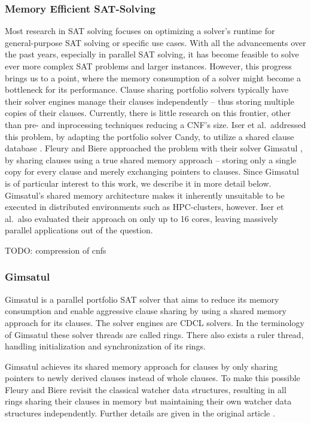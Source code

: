 \documentclass[12pt,a4paper,twoside]{scrartcl}
\numberwithin{equation}{section}
\begin{document}
\subsubsection{Memory Efficient SAT-Solving}

Most research in SAT solving focuses on optimizing a solver's runtime for general-purpose SAT solving or specific use cases. With all the advancements over the past years, especially in parallel SAT solving, it has become feasible to solve ever more complex SAT problems and larger instances. However, this progress brings us to a point, where the memory consumption of a solver might become a bottleneck for its performance. Clause sharing portfolio solvers typically have their solver engines manage their clauses independently -- thus storing multiple copies of their clauses. Currently, there is little research on this frontier, other than pre- and inprocessing techniques reducing a CNF's size. Iser et al.~addressed this problem, by adapting the portfolio solver Candy, to utilize a shared clause database \cite{iser2019memory}. Fleury and Biere approached the problem with their solver Gimsatul \cite{gimsatul}, by sharing clauses using a true shared memory approach -- storing only a single copy for every clause and merely exchanging pointers to clauses. Since Gimsatul is of particular interest to this work, we describe it in more detail below. Gimsatul's shared memory architecture makes it inherently unsuitable to be executed in distributed environments such as HPC-clusters, however. Iser et al.~also evaluated their approach on only up to 16 cores, leaving massively parallel applications out of the question.

TODO: compression of cnfs

\subsubsection{Gimsatul}

Gimsatul \cite{gimsatul} is a parallel portfolio SAT solver that aims to reduce its memory consumption and enable aggressive clause sharing by using a shared memory approach for its clauses. The solver engines are CDCL solvers. In the terminology of Gimsatul these solver threads are called rings. There also exists a ruler thread, handling initialization and synchronization of its rings.

Gimsatul achieves its shared memory approach for clauses by only sharing pointers to newly derived clauses instead of whole clauses. To make this possible Fleury and Biere revisit the classical watcher data structures, resulting in all rings sharing their clauses in memory but maintaining their own watcher data structures independently. Further details are given in the original article \cite{gimsatul}.
\end{document}
